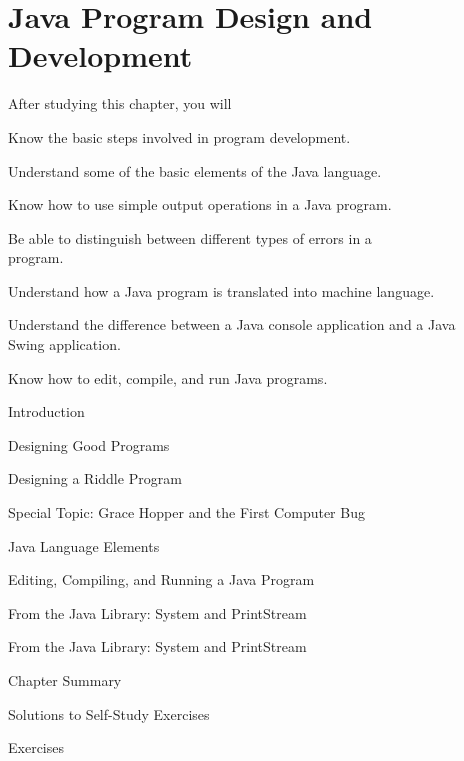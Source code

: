 

\setcounter{chapter}{0}
\setcounter{SSTUDYcount}{1}
\chapter{Java Program Design and Development}
\label{ch:intro2}

\CObegin
{}
\noindent After studying this chapter, you will

\begin{COBL}
\item  Know the basic steps involved in program
       development.
\item  Understand some of the basic elements of the Java language.
\item  Know how to use simple output operations in
       a Java program.
\item  Be able to distinguish between different types of errors in
       a \\program.
\item  Understand how a Java program is translated into
       machine language.
\item  Understand the difference between a Java console application
       and a Java \\Swing application.
\item  Know how to edit, compile, and run Java programs.
\end{COBL}


\begin{COL}
\item Introduction
\item Designing Good Programs
\item Designing a Riddle Program
\item[] {{\color{cyan}Special Topic:} Grace Hopper and the First Computer Bug}
\item Java Language Elements
\item Editing, Compiling, and Running a Java Program
\item From the Java Library: System and PrintStream
\item From the Java Library: {System} and {PrintStream}
\par\small\item[] Chapter Summary
\par\small\item[] Solutions to Self-Study Exercises
\par\small\item[] Exercises
\end{COL}
\COend

